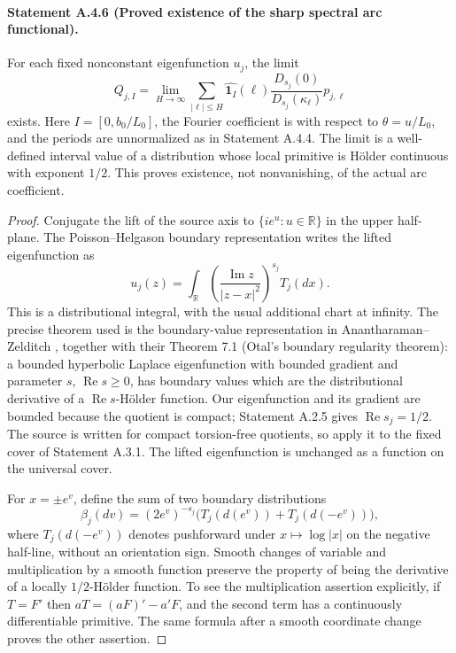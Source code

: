 \paragraph{Statement A.4.6 (Proved existence of the sharp spectral arc functional).}
For each fixed nonconstant eigenfunction $u_j$, the limit
\[
 Q_{j,I}=\lim_{H\to\infty}
 \sum_{|\ell|\leq H}\widehat{\mathbf1_I}(\ell)
 \frac{D_{s_j}(0)}{D_{s_j}(\kappa_\ell)}p_{j,\ell}
\]
exists. Here $I=[0,b_0/L_0]$, the Fourier coefficient is with
respect to $\theta=u/L_0$, and the periods are unnormalized as
in Statement A.4.4. The limit is a well-defined interval value
of a distribution whose local primitive is H\"older continuous
with exponent $1/2$. This proves existence, not nonvanishing,
of the actual arc coefficient.
\begin{proof}
Conjugate the lift of the source axis to $\{ie^u:u\in\mathbb R\}$
in the upper half-plane. The Poisson--Helgason boundary
representation writes the lifted eigenfunction as
\[
 u_j(z)=\int_{\mathbb R}
       \left(\frac{\operatorname{Im}z}{|z-x|^2}\right)^{s_j}
       T_j(dx).
\]
This is a distributional integral, with the usual additional
chart at infinity. The precise theorem used is the boundary-value
representation in Anantharaman--Zelditch
\cite[Theorem 3.2]{AnantharamanZelditch2012}, together with their
Theorem 7.1 (Otal's boundary regularity theorem): a bounded
hyperbolic Laplace eigenfunction with bounded gradient and
parameter $s$, $\operatorname{Re}s\geq0$, has boundary values
which are the distributional derivative of a
$\operatorname{Re}s$-H\"older function. Our eigenfunction and
its gradient are bounded because the quotient is compact;
Statement A.2.5 gives $\operatorname{Re}s_j=1/2$. The source is
written for compact torsion-free quotients, so apply it to the
fixed cover of Statement A.3.1. The lifted eigenfunction is
unchanged as a function on the universal cover.

For $x=\pm e^v$, define the sum of two boundary distributions
\[
 \beta_j(dv)=(2e^v)^{-s_j}
       \bigl(T_j(d(e^v))+T_j(d(-e^v))\bigr),
\]
where $T_j(d(-e^v))$ denotes pushforward under
$x\mapsto\log|x|$ on the negative half-line, without an
orientation sign. Smooth changes of variable and multiplication
by a smooth function preserve the property of being the
derivative of a locally $1/2$-H\"older function. To see the
multiplication assertion explicitly, if $T=F'$ then
$aT=(aF)'-a'F$, and the second term has a continuously
differentiable primitive. The same formula after a smooth
coordinate change proves the other assertion.


\end{proof}
